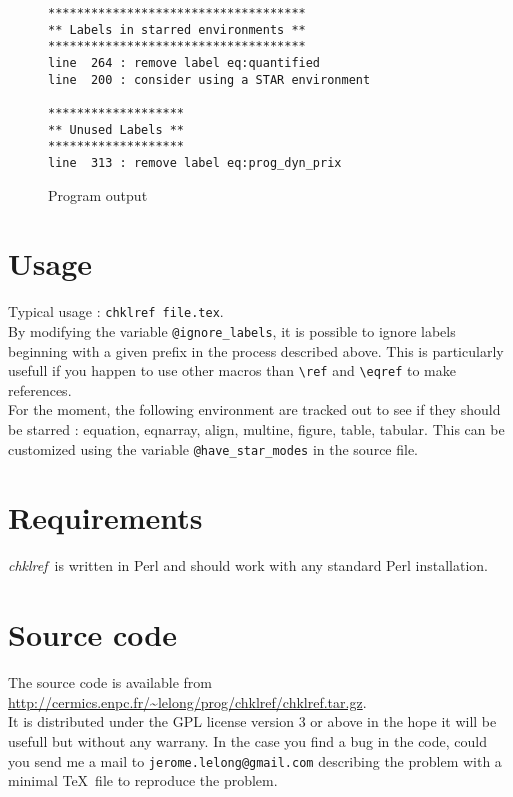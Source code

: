 \documentclass[a4paper,11pt,twoside]{article}
\def\chk{{\it chklref}}
\def\endpage{}%
\def\endpage{\HCode{</div>}}%
\begin{document}
\begin{figure}[htbp]
  \centering
\begin{verbatim}
************************************
** Labels in starred environments **
************************************
line  264 : remove label eq:quantified
line  200 : consider using a STAR environment

*******************
** Unused Labels **
*******************
line  313 : remove label eq:prog_dyn_prix
\end{verbatim}
  \caption{Program output}
  \label{fig:output}
\end{figure}


\section{Usage}

Typical usage : \verb!chklref file.tex!.
\\

\noindent By modifying the variable \verb!@ignore_labels!, it is possible to ignore labels
beginning with a given prefix in the process described above. This is
particularly usefull if you happen to use other macros than \verb!\ref! and
\verb!\eqref! to make references.
\\

\noindent For the moment, the following environment are tracked out to see if
they should be starred : equation, eqnarray, align, multine, figure, table,
tabular. This can be customized using the variable \verb!@have_star_modes! in the
source file.

\section{Requirements}

\chk\ is written in Perl and should work with any standard Perl
installation.


\section{Source code}

The source code is available from
\url{http://cermics.enpc.fr/~lelong/prog/chklref/chklref.tar.gz}.
\\

\noindent It is distributed under the GPL license version 3 or above in the
hope it will be usefull but without any warrany. In the case you find a bug in
the code, could you send me a mail to \verb!jerome.lelong@gmail.com! describing
the problem with a minimal \TeX\ file to reproduce the problem.

\endpage
\end{document}
